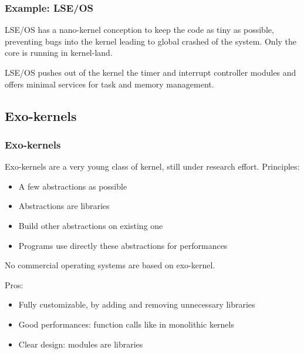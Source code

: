 %
%

\begin{frame}
  \frametitle{Example: LSE/OS}

  LSE/OS has a nano-kernel conception to keep the code as tiny as possible, preventing bugs into the kernel leading to global crashed of the system. Only the core is running in kernel-land.

  \begin{center}
  \end{center}

  LSE/OS pushes out of the kernel the timer and interrupt controller modules and offers minimal services for task and memory management.

\end{frame}

%
%

\subsection{Exo-kernels}

%
%

\begin{frame}
  \frametitle{Exo-kernels}

  Exo-kernels are a very young class of kernel, still under research effort. Principles:

  \begin{itemize}
  \item
    A few abstractions as possible
  \item
    Abstractions are libraries
  \item
    Build other abstractions on existing one
  \item
    Programs use directly these abstractions for performances
  \end{itemize}

  \-

  No commercial operating systems are based on exo-kernel.

  \-

  Pros:

  \begin{itemize}
  \item
    Fully customizable, by adding and removing unnecessary libraries
  \item
    Good performances: function calls like in monolithic kernels
  \item
    Clear design: modules are libraries
  \end{itemize}

\end{frame}

